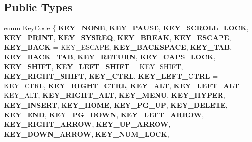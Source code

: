 \subsection*{Public Types}
\begin{DoxyCompactItemize}
\item 
enum \hyperlink{classEventKeyboard_a7cd3fa46515673276ce8ec7f0e051606}{Key\+Code} \{ \newline
{\bfseries K\+E\+Y\+\_\+\+N\+O\+NE}, 
{\bfseries K\+E\+Y\+\_\+\+P\+A\+U\+SE}, 
{\bfseries K\+E\+Y\+\_\+\+S\+C\+R\+O\+L\+L\+\_\+\+L\+O\+CK}, 
{\bfseries K\+E\+Y\+\_\+\+P\+R\+I\+NT}, 
\newline
{\bfseries K\+E\+Y\+\_\+\+S\+Y\+S\+R\+EQ}, 
{\bfseries K\+E\+Y\+\_\+\+B\+R\+E\+AK}, 
{\bfseries K\+E\+Y\+\_\+\+E\+S\+C\+A\+PE}, 
{\bfseries K\+E\+Y\+\_\+\+B\+A\+CK} = K\+E\+Y\+\_\+\+E\+S\+C\+A\+PE, 
\newline
{\bfseries K\+E\+Y\+\_\+\+B\+A\+C\+K\+S\+P\+A\+CE}, 
{\bfseries K\+E\+Y\+\_\+\+T\+AB}, 
{\bfseries K\+E\+Y\+\_\+\+B\+A\+C\+K\+\_\+\+T\+AB}, 
{\bfseries K\+E\+Y\+\_\+\+R\+E\+T\+U\+RN}, 
\newline
{\bfseries K\+E\+Y\+\_\+\+C\+A\+P\+S\+\_\+\+L\+O\+CK}, 
{\bfseries K\+E\+Y\+\_\+\+S\+H\+I\+FT}, 
{\bfseries K\+E\+Y\+\_\+\+L\+E\+F\+T\+\_\+\+S\+H\+I\+FT} = K\+E\+Y\+\_\+\+S\+H\+I\+FT, 
{\bfseries K\+E\+Y\+\_\+\+R\+I\+G\+H\+T\+\_\+\+S\+H\+I\+FT}, 
\newline
{\bfseries K\+E\+Y\+\_\+\+C\+T\+RL}, 
{\bfseries K\+E\+Y\+\_\+\+L\+E\+F\+T\+\_\+\+C\+T\+RL} = K\+E\+Y\+\_\+\+C\+T\+RL, 
{\bfseries K\+E\+Y\+\_\+\+R\+I\+G\+H\+T\+\_\+\+C\+T\+RL}, 
{\bfseries K\+E\+Y\+\_\+\+A\+LT}, 
\newline
{\bfseries K\+E\+Y\+\_\+\+L\+E\+F\+T\+\_\+\+A\+LT} = K\+E\+Y\+\_\+\+A\+LT, 
{\bfseries K\+E\+Y\+\_\+\+R\+I\+G\+H\+T\+\_\+\+A\+LT}, 
{\bfseries K\+E\+Y\+\_\+\+M\+E\+NU}, 
{\bfseries K\+E\+Y\+\_\+\+H\+Y\+P\+ER}, 
\newline
{\bfseries K\+E\+Y\+\_\+\+I\+N\+S\+E\+RT}, 
{\bfseries K\+E\+Y\+\_\+\+H\+O\+ME}, 
{\bfseries K\+E\+Y\+\_\+\+P\+G\+\_\+\+UP}, 
{\bfseries K\+E\+Y\+\_\+\+D\+E\+L\+E\+TE}, 
\newline
{\bfseries K\+E\+Y\+\_\+\+E\+ND}, 
{\bfseries K\+E\+Y\+\_\+\+P\+G\+\_\+\+D\+O\+WN}, 
{\bfseries K\+E\+Y\+\_\+\+L\+E\+F\+T\+\_\+\+A\+R\+R\+OW}, 
{\bfseries K\+E\+Y\+\_\+\+R\+I\+G\+H\+T\+\_\+\+A\+R\+R\+OW}, 
\newline
{\bfseries K\+E\+Y\+\_\+\+U\+P\+\_\+\+A\+R\+R\+OW}, 
{\bfseries K\+E\+Y\+\_\+\+D\+O\+W\+N\+\_\+\+A\+R\+R\+OW}, 
{\bfseries K\+E\+Y\+\_\+\+N\+U\+M\+\_\+\+L\+O\+CK}, 

\end{DoxyCompactItemize}
